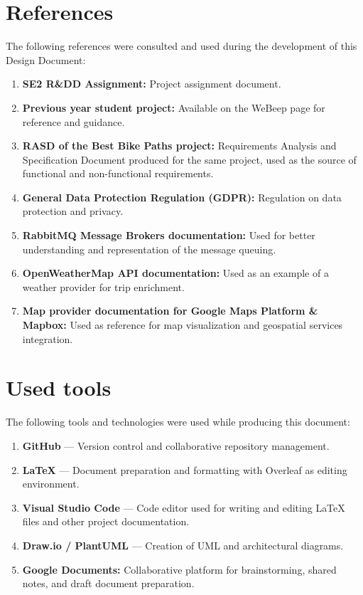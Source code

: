 \section{References}
\label{sec:dd_references}%

The following references were consulted and used during the development of this Design Document:

\begin{enumerate}
    \item \textbf{SE2 R\&DD Assignment:} Project assignment document.  
    \item \textbf{Previous year student project:} Available on the WeBeep page for reference and guidance.
    \item \textbf{RASD of the Best Bike Paths project:} Requirements Analysis and Specification Document produced for the same project, used as the source of functional and non-functional requirements.
    \item \textbf{General Data Protection Regulation (GDPR):} Regulation on data protection and privacy.
    \item \textbf{RabbitMQ Message Brokers documentation:} Used for better understanding and representation of the message queuing.
    \item \textbf{OpenWeatherMap API documentation:} Used as an example of a weather provider for trip enrichment.
    \item \textbf{Map provider documentation for Google Maps Platform & Mapbox:} Used as reference for map visualization and geospatial services integration.
\end{enumerate}

\section{Used tools}
\label{sec:dd_used_tools}%

The following tools and technologies were used while producing this document:

\begin{enumerate}
    \item \textbf{GitHub} --- Version control and collaborative repository management.
    \item \textbf{\LaTeX{}} --- Document preparation and formatting with Overleaf as editing environment.
    \item \textbf{Visual Studio Code} --- Code editor used for writing and editing \LaTeX{} files and other project documentation.
    \item \textbf{Draw.io / PlantUML} --- Creation of UML and architectural diagrams.
    \item \textbf{Google Documents:} Collaborative platform for brainstorming, shared notes, and draft document preparation.
\end{enumerate}

